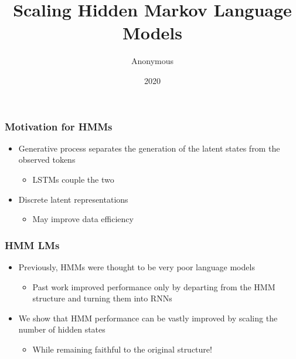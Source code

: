 \documentclass{beamer}
\title{Scaling Hidden Markov Language Models}
\author{Anonymous}
\date{2020}
\begin{document}
\frame{\titlepage}

\begin{frame}
\frametitle{Motivation for HMMs}
\begin{itemize}
\item Generative process separates the generation of the latent states from the observed tokens
    \begin{itemize}
    \item LSTMs couple the two
    \end{itemize}
\item Discrete latent representations
    \begin{itemize}
    \item May improve data efficiency \citep{jin2020discretelv}
    \end{itemize}
\end{itemize}
\end{frame}

\begin{frame}
\frametitle{HMM LMs}
\begin{itemize}
\item Previously, HMMs were thought to be very poor language models 
    \begin{itemize}
    \item Past work improved performance only by departing from the HMM structure
        and turning them into RNNs \citep{buys2018hmm}
    \end{itemize}
\item We show that HMM performance can be vastly improved by scaling the number of hidden states
    \begin{itemize}
    \item While remaining faithful to the original structure!
    \end{itemize}
\end{itemize}
\end{frame}
\end{document}
